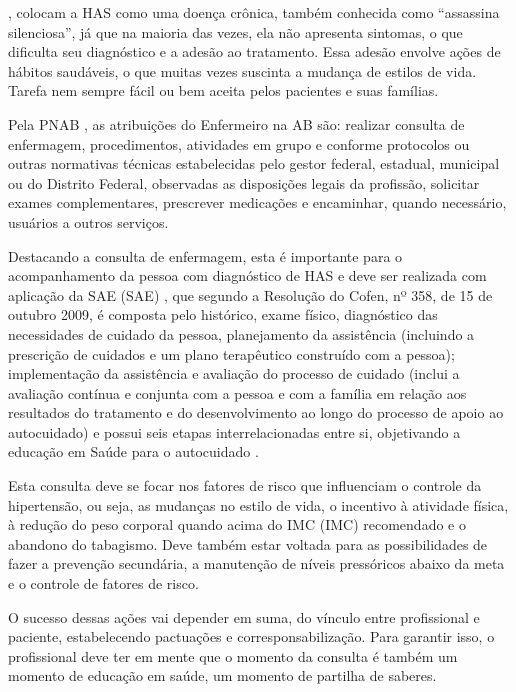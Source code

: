 , colocam a HAS como uma doença crônica, também conhecida como ``assassina silenciosa'', já que na maioria das vezes, ela não apresenta sintomas, o que dificulta seu diagnóstico e a adesão ao tratamento. Essa adesão envolve ações de hábitos saudáveis, o que muitas vezes suscinta a mudança de estilos de vida. Tarefa nem sempre fácil ou bem aceita pelos pacientes e suas famílias. 

Pela PNAB , as atribuições do Enfermeiro na AB são: realizar consulta de enfermagem, procedimentos, atividades em grupo e conforme protocolos ou outras normativas técnicas estabelecidas pelo gestor federal, estadual, municipal ou do Distrito Federal, observadas as disposições legais da profissão, solicitar exames complementares, prescrever medicações e encaminhar, quando necessário, usuários a outros serviços. 

Destacando a consulta de enfermagem, esta é importante para o acompanhamento da pessoa com diagnóstico de HAS e deve ser realizada com aplicação da \acrlong{SAE} (\acrshort{SAE}) \cite{atencaobasica37}, que segundo a Resolução do Cofen, nº 358, de 15 de outubro 2009, é composta pelo histórico, exame físico, diagnóstico das necessidades de cuidado da pessoa, planejamento da assistência (incluindo a prescrição de cuidados e um plano terapêutico construído com a pessoa); implementação da assistência e avaliação do processo de cuidado (inclui a avaliação contínua e conjunta com a pessoa e com a família em relação aos resultados do tratamento e do desenvolvimento ao longo do processo de apoio ao autocuidado) e possui seis etapas interrelacionadas entre si, objetivando a educação em Saúde para o autocuidado \cite{de2009resoluccao}.

Esta consulta deve se focar nos fatores de risco que influenciam o controle da hipertensão, ou seja, as mudanças no estilo de vida, o incentivo à atividade física, à redução do peso corporal quando acima do \acrlong{IMC} (\acrshort{IMC}) recomendado e o abandono do tabagismo. Deve também estar voltada para as possibilidades de fazer a prevenção secundária, a manutenção de níveis pressóricos abaixo da meta e o controle de fatores de risco.

O sucesso dessas ações vai depender em suma, do vínculo entre profissional e paciente, estabelecendo pactuações e corresponsabilização. Para garantir isso, o profissional deve ter em mente que o momento da consulta é também um momento de educação em saúde, um momento de partilha de saberes.

